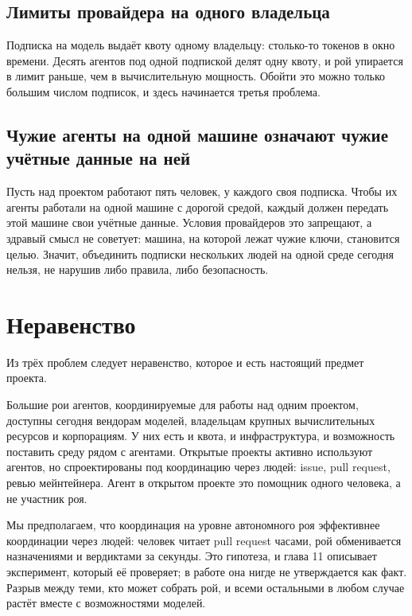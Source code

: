 \subsection{Лимиты провайдера на одного владельца}

Подписка на модель выдаёт квоту одному владельцу: столько-то токенов в окно времени. Десять агентов под одной подпиской делят одну квоту, и рой упирается в лимит раньше, чем в вычислительную мощность. Обойти это можно только большим числом подписок, и здесь начинается третья проблема.

\subsection{Чужие агенты на одной машине означают чужие учётные данные на ней}

Пусть над проектом работают пять человек, у каждого своя подписка. Чтобы их агенты работали на одной машине с дорогой средой, каждый должен передать этой машине свои учётные данные. Условия провайдеров это запрещают, а здравый смысл не советует: машина, на которой лежат чужие ключи, становится целью. Значит, объединить подписки нескольких людей на одной среде сегодня нельзя, не нарушив либо правила, либо безопасность.

\section{Неравенство}

Из трёх проблем следует неравенство, которое и есть настоящий предмет проекта.

Большие рои агентов, координируемые для работы над одним проектом, доступны сегодня вендорам моделей, владельцам крупных вычислительных ресурсов и корпорациям. У них есть и квота, и инфраструктура, и возможность поставить среду рядом с агентами. Открытые проекты активно используют агентов, но спроектированы под координацию через людей: issue, pull request, ревью мейнтейнера. Агент в открытом проекте это помощник одного человека, а не участник роя.

Мы предполагаем, что координация на уровне автономного роя эффективнее координации через людей: человек читает pull request часами, рой обменивается назначениями и вердиктами за секунды. Это гипотеза, и глава 11 описывает эксперимент, который её проверяет; в работе она нигде не утверждается как факт. Разрыв между теми, кто может собрать рой, и всеми остальными в любом случае растёт вместе с возможностями моделей.

